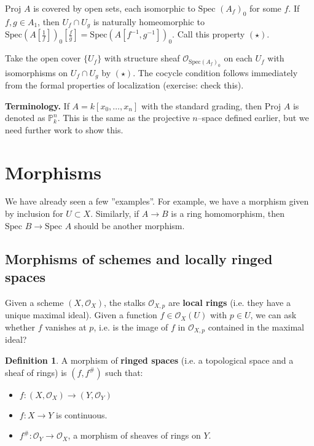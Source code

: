 \documentclass{article}
\theoremstyle{definition}
\newtheorem{defn}{Definition}[section]
\begin{document}
$\text{Proj }A$ is covered by open sets, each isomorphic to $\text{Spec }(A_f)_0$ for some $f$. If $f, g \in A_1$, then $U_f \cap U_g$ is naturally homeomorphic to $\text{Spec}(A[\frac{1}{f}])_0[\frac{f}{g}] = \text{Spec}(A[f^{-1},g^{-1}])_0$. Call this property $(\star)$. 
\vspace{1mm}
 
Take the open cover $\{U_f\}$ with structure sheaf $\mathcal{O}_{\text{Spec}(A_f)_0}$ on each $U_f$ with isomorphisms on $U_f \cap U_g$ by $(\star)$. The cocycle condition follows immediately from the formal properties of localization (exercise: check this).
\vspace{1mm}
 
\textbf{Terminology.} If $A = k[x_0,\ldots,x_n]$ with the standard grading, then $\text{Proj }A$ is denoted as $\mathbb{P}_k^n$. This is the same as the projective $n$--space defined earlier, but we need further work to show this.

\section{Morphisms}

We have already seen a few ''examples''. For example, we have a morphism given by inclusion for $U \subset X$. Similarly, if $A \to B$ is a ring homomorphism, then $\text{Spec }B \to \text{Spec }A$ should be another morphism.

\subsection{Morphisms of schemes and locally ringed spaces}

Given a scheme $(X, \mathcal{O}_X)$, the stalks $\mathcal{O}_{X,p}$ are \textbf{local rings} (i.e. they have a unique maximal ideal). Given a function $f \in \mathcal{O}_X(U)$ with $p \in U$, we can ask whether $f$ vanishes at $p$, i.e. is the image of $f$ in $\mathcal{O}_{X,p}$ contained in the maximal ideal?

\begin{defn}
    A morphism of \textbf{ringed spaces} (i.e. a topological space and a sheaf of rings) is $(f,f^\#)$ such that:
    \begin{itemize}
        \item $f: (X, \mathcal{O}_X) \to (Y, \mathcal{O}_Y)$
        \item $f : X \to Y$ is continuous.
        \item $f^\# : \mathcal{O}_Y \to \mathcal{O}_X$, a morphism of sheaves of rings on $Y$.
    \end{itemize}
\end{defn}
\end{document}
